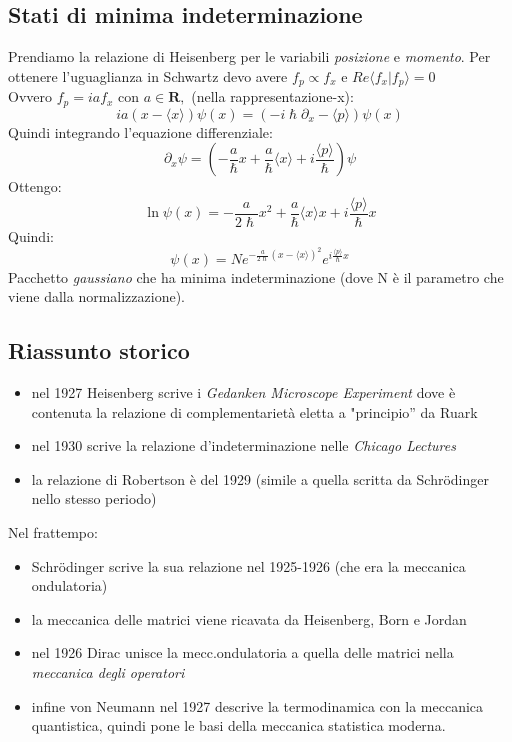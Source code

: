 \subsection{Stati di minima indeterminazione} %
Prendiamo la relazione di Heisenberg per le variabili \emph{posizione} e \emph{momento}.
Per ottenere l'uguaglianza in Schwartz devo avere $f_p \propto f_x$ e $Re\langle f_x | f_p \rangle = 0$\\
Ovvero $f_p = iaf_x$ con $a\in\textbf{R},$ (nella rappresentazione-x):
\begin{equation}
 ia(x-\langle x \rangle)\psi(x)= (-i\hslash\partial_x - \langle p \rangle)\psi(x)
\end{equation}
Quindi integrando l'equazione differenziale:
\begin{equation}
\partial_x\psi = (-\frac{a}{\hslash}x + \frac{a}{\hslash}\langle x \rangle + i\frac{\langle p \rangle}{\hslash})\psi
\end{equation}
Ottengo:
\begin{equation}
\ln\psi(x) = -\frac{a}{2\hslash}x^2 + \frac{a}{\hslash}\langle x \rangle x + i\frac{\langle p \rangle}{\hslash}x
\end{equation}
Quindi:
\begin{equation}
\psi(x) = Ne^{-\frac{a}{2\hslash}(x-\langle x \rangle)^2}e^{i\frac{\langle p \rangle}{\hslash}x}
\end{equation}
Pacchetto \emph{gaussiano} che ha minima indeterminazione (dove N è il parametro che viene dalla normalizzazione).

\subsection{Riassunto storico} %
\begin{itemize}
 \item nel 1927 Heisenberg scrive i \emph{Gedanken Microscope Experiment} dove è contenuta la relazione di complementarietà eletta a "principio'' da Ruark
 \item nel 1930 scrive la relazione d'indeterminazione nelle \emph{Chicago Lectures}
 \item la relazione di Robertson è del 1929 (simile a quella scritta da Schr\"{o}dinger nello stesso periodo)
\end{itemize}
Nel frattempo:
\begin{itemize}
 \item Schr\"{o}dinger scrive la sua relazione nel 1925-1926 (che era la meccanica ondulatoria)
 \item la meccanica delle matrici viene ricavata da Heisenberg, Born e Jordan
 \item nel 1926 Dirac unisce la mecc.ondulatoria a quella delle matrici nella \emph{meccanica degli operatori}
 \item infine von Neumann nel 1927 descrive la termodinamica con la meccanica quantistica, quindi pone le basi della meccanica statistica moderna.
\end{itemize}